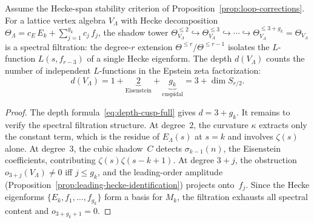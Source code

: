 \begin{theorem}
\label{thm:spectral-decomposition-principle}
\ClaimStatusProvedHere
Assume the Hecke-span stability criterion of
Proposition~\textup{\ref{prop:loop-corrections}}. For a lattice
vertex algebra $V_\Lambda$ with Hecke decomposition
$\Theta_\Lambda = c_E\,E_k + \sum_{j=1}^{g_k} c_j\,f_j$,
the shadow tower
$\Theta_{V_\Lambda}^{\le 2} \hookrightarrow
\Theta_{V_\Lambda}^{\le 3} \hookrightarrow
\cdots \hookrightarrow
\Theta_{V_\Lambda}^{\le 3+g_k} = \Theta_{V_\Lambda}$
is a spectral filtration: the degree-$r$ extension
$\Theta^{\le r}/\Theta^{\le r-1}$ isolates the $L$-function
$L(s,f_{r-3})$ of a single Hecke eigenform. The depth
$d(V_\Lambda)$ counts the number of independent $L$-functions
in the Epstein zeta factorization:
\begin{equation}\label{eq:depth-L-count}
 d(V_\Lambda)
 = 1
 + \underbrace{2}_{\text{Eisenstein}}
 + \underbrace{g_k}_{\text{cuspidal}}
 = 3 + \dim S_{r/2}.
\end{equation}
\end{theorem}

\begin{proof}
The depth formula~\eqref{eq:depth-cusp-full} gives
$d = 3 + g_k$. It remains to verify the spectral filtration
structure. At degree~$2$, the curvature $\kappa$ extracts only
the constant term, which is the residue of $E_\Lambda(s)$ at
$s = k$ and involves $\zeta(s)$ alone. At degree~$3$, the
cubic shadow~$C$ detects $\sigma_{k-1}(n)$, the Eisenstein
coefficients, contributing $\zeta(s)\zeta(s{-}k{+}1)$. At
degree $3+j$, the obstruction $o_{3+j}(V_\Lambda) \ne 0$ iff
$j \le g_k$, and the leading-order amplitude
(Proposition~\ref{prop:leading-hecke-identification}) projects
onto~$f_j$. Since the Hecke eigenforms $\{E_k, f_1,\ldots,f_{g_k}\}$
form a basis for $M_k$, the filtration exhausts all spectral
content and $o_{3+g_k+1} = 0$.
\end{proof}


